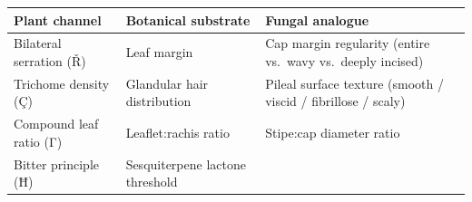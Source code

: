\begin{longtable}[]{@{}lll@{}}
\toprule
\begin{minipage}[b]{0.30\columnwidth}\raggedright
Plant channel\strut
\end{minipage} & \begin{minipage}[b]{0.30\columnwidth}\raggedright
Botanical substrate\strut
\end{minipage} & \begin{minipage}[b]{0.30\columnwidth}\raggedright
Fungal analogue\strut
\end{minipage}\tabularnewline
\midrule
\endhead
\begin{minipage}[t]{0.30\columnwidth}\raggedright
Bilateral serration (Ř)\strut
\end{minipage} & \begin{minipage}[t]{0.30\columnwidth}\raggedright
Leaf margin\strut
\end{minipage} & \begin{minipage}[t]{0.30\columnwidth}\raggedright
Cap margin regularity (entire vs.~wavy vs.~deeply incised)\strut
\end{minipage}\tabularnewline
\begin{minipage}[t]{0.30\columnwidth}\raggedright
Trichome density (Ç)\strut
\end{minipage} & \begin{minipage}[t]{0.30\columnwidth}\raggedright
Glandular hair distribution\strut
\end{minipage} & \begin{minipage}[t]{0.30\columnwidth}\raggedright
Pileal surface texture (smooth / viscid / fibrillose / scaly)\strut
\end{minipage}\tabularnewline
\begin{minipage}[t]{0.30\columnwidth}\raggedright
Compound leaf ratio (Γ)\strut
\end{minipage} & \begin{minipage}[t]{0.30\columnwidth}\raggedright
Leaflet:rachis ratio\strut
\end{minipage} & \begin{minipage}[t]{0.30\columnwidth}\raggedright
Stipe:cap diameter ratio\strut
\end{minipage}\tabularnewline
\begin{minipage}[t]{0.30\columnwidth}\raggedright
Bitter principle (Ħ)\strut
\end{minipage} & \begin{minipage}[t]{0.30\columnwidth}\raggedright
Sesquiterpene lactone threshold\strut

\end{minipage}
\end{longtable}
